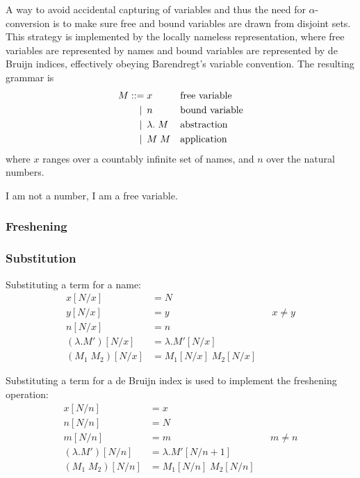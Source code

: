 \documentclass[a4paper,11pt]{article}
\begin{document}
A way to avoid accidental capturing of variables and thus the need for
$\alpha$-conversion is to make sure free and bound variables are drawn
from disjoint sets.
This strategy is implemented by the locally nameless representation,
where free variables are represented by names and bound variables are
represented by de Bruijn indices, effectively obeying Barendregt's
variable convention.
The resulting grammar is
\begin{align*}
  M ::=             &\; x
  && \text{free variable} \\
  \llap{\textbar\:} &\; n
  && \text{bound variable} \\
  \llap{\textbar\:} &\; \lambda . \; M
    && \text{abstraction} \\
  \llap{\textbar\:} &\; M \; M
  && \text{application}
\end{align*}
where $x$ ranges over a countably infinite set of names, and $n$ over
the natural numbers.

I am not a number, I am a free variable.

\subsubsection*{Freshening}

\subsubsection*{Substitution}

Substituting a term for a name:
\begin{align*}
  x[N/x]             &= N\\
  y[N/x]             &= y                 && \text{$x \neq y$} \\
  n[N/x]             &= n\\
  (\lambda .M')[N/x] &= \lambda .M'[N/x]\\
  (M_1 \; M_2)[N/x]  &= M_1[N/x] \; M_2[N/x]
\end{align*}

Substituting a term for a de Bruijn index is used to implement the
freshening operation:
\begin{align*}
  x[N/n]             &= x\\
  n[N/n]             &= N\\
  m[N/n]             &= m                    && \text{$m \neq n$} \\
  (\lambda .M')[N/n] &= \lambda .M'[N / n\!+\!1]\\
  (M_1 \; M_2)[N/n]  &= M_1[N/n] \; M_2[N/n]
\end{align*}
\end{document}
